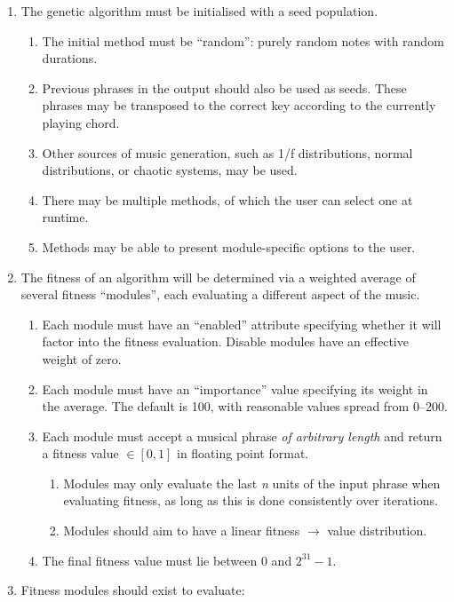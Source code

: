 \begin{enumerate}[resume]
	\item The genetic algorithm must be initialised with a seed population.
	\begin{enumerate}
		\item The initial method must be ``random'': purely random notes with random durations.
		\item Previous phrases in the output should also be used as seeds. These phrases may be transposed to the correct key according to the currently playing chord.
		\item Other sources of music generation, such as 1/f distributions, normal distributions, or chaotic systems, may be used.
		\item There may be multiple methods, of which the user can select one at runtime.
		\item Methods may be able to present module-specific options to the user.
	\end{enumerate}
	\item The fitness of an algorithm will be determined via a weighted average of several fitness ``modules'', each evaluating a different aspect of the music.
	\begin{enumerate}
		\item Each module must have an ``enabled'' attribute specifying whether it will factor into the fitness evaluation. Disable modules have an effective weight of zero.
		\item Each module must have an ``importance'' value specifying its weight in the average. The default is 100, with reasonable values spread from 0--200.
		\item Each module must accept a musical phrase \emph{of arbitrary length} and return a fitness value $\in [0,1]$ in floating point format.
		\begin{enumerate}
			\item Modules may only evaluate the last \emph{n} units of the input phrase when evaluating fitness, as long as this is done consistently over iterations.
			\item Modules should aim to have a linear fitness $\to$ value distribution.
		\end{enumerate}
		\item The final fitness value must lie between 0 and $2^{31} - 1$.
	\end{enumerate}
	\item Fitness modules should exist to evaluate:
		\begin{enumerate}

\end{enumerate}
\end{enumerate}
